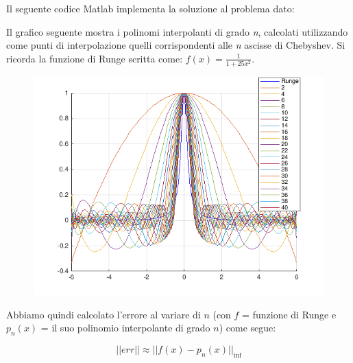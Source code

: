 \begin{center}
\large\noindent{}\end{center}

\noindent Il seguente codice Matlab implementa la soluzione al problema dato: 

\vspace*{1cm}
\noindent Il grafico seguente mostra i polinomi interpolanti di grado \textit{n}, calcolati utilizzando come punti di interpolazione quelli corrispondenti alle \textit{n} ascisse di Chebyshev. Si ricorda la funzione di Runge scritta come:  \(f(x) = \frac{1}{1+25x^2}\). \\

\hspace{3.5cm}

\begin{figure}[H]
	\centering
    \includegraphics[width=\textwidth,height=\textheight,keepaspectratio]{Codici/Cap4/es7_cap4.png}
\end{figure}

\pagebreak
\noindent Abbiamo quindi calcolato l'errore al variare di $n$ (con $f$ = funzione di Runge e $p_n(x)$ = il suo polinomio interpolante di grado $n$) come segue:

$$
||err|| \approx ||f(x) - p_n(x)||_{\inf}
$$


